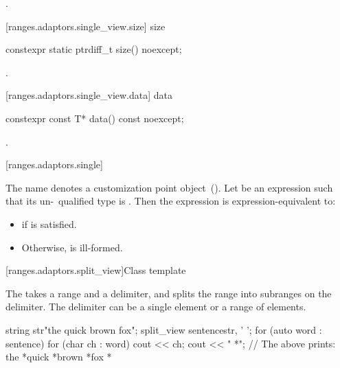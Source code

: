 \begin{itemdescr}
\pnum
\requires {}

\pnum
\returns {}.
\end{itemdescr}

[ranges.adaptors.single_view.size]{ size}

%
\begin{itemdecl}
constexpr static ptrdiff_t size() noexcept;
\end{itemdecl}

\begin{itemdescr}
\pnum
\requires {}

\pnum
\returns {}.
\end{itemdescr}

[ranges.adaptors.single_view.data]{ data}

%
\begin{itemdecl}
constexpr const T* data() const noexcept;
\end{itemdecl}

\begin{itemdescr}
\pnum
\requires {}

\pnum
\returns {}.
\end{itemdescr}

[ranges.adaptors.single]{}

\pnum
The name  denotes a customization point object~().
Let  be an expression such that its un-\cv\ qualified type
is . Then the expression  is expression-equivalent
to:

\begin{itemize}
\item {} if  is satisfied.
\item Otherwise,  is ill-formed.
\end{itemize}

[ranges.adaptors.split_view]{Class template }

\pnum
The  takes a range and a delimiter, and splits the range into
subranges on the delimiter. The delimiter can be a single element or a range of
elements.

\pnum
\enterexample
\begin{codeblock}
string str{"the quick brown fox"};
split_view sentence{str, ' '};
for (auto word : sentence) {
  for (char ch : word)
    cout << ch;
  cout << " *";
}
// The above prints: the *quick *brown *fox *
\end{codeblock}
\exitexample

